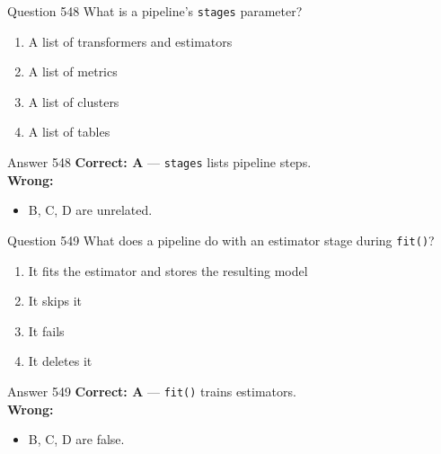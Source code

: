 \documentclass[aspectratio=169,11pt]{beamer}
\begin{document}
	\begin{frame}{Question 548}
		What is a pipeline's \texttt{stages} parameter?
		\begin{enumerate}[label=\Alph*.]
			\item A list of transformers and estimators
			\item A list of metrics
			\item A list of clusters
			\item A list of tables
		\end{enumerate}
	\end{frame}
	\begin{frame}{Answer 548}
		\textbf{Correct: A} --- \texttt{stages} lists pipeline steps.\\
		\vspace{0.5em}
		\textbf{Wrong:}
		\begin{itemize}
			\item B, C, D are unrelated.
		\end{itemize}
	\end{frame}
	
	\begin{frame}{Question 549}
		What does a pipeline do with an estimator stage during \texttt{fit()}?
		\begin{enumerate}[label=\Alph*.]
			\item It fits the estimator and stores the resulting model
			\item It skips it
			\item It fails
			\item It deletes it
		\end{enumerate}
	\end{frame}
	\begin{frame}{Answer 549}
		\textbf{Correct: A} --- \texttt{fit()} trains estimators.\\
		\vspace{0.5em}
		\textbf{Wrong:}
		\begin{itemize}
			\item B, C, D are false.
		\end{itemize}
	\end{frame}
	
\end{document}
